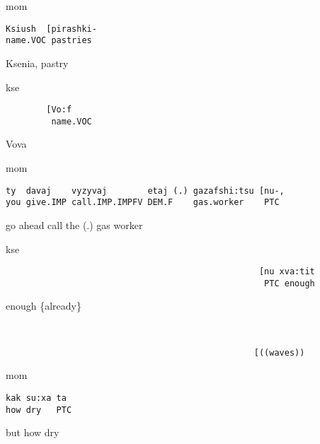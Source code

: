 \documentclass[output=paper,modfonts,nonflat]{langsci/langscibook}
\begin{document}
\vspace{2mm}
%
\begin{transbox}{1}{mom}
\begin{verbatim}
Ksiush  [pirashki-
name.VOC pastries
\end{verbatim}
Ksenia, pastry
\end{transbox}
%
\begin{transbox}{2}{kse}
\begin{verbatim}
        [Vo:f
         name.VOC
\end{verbatim}
\hspace{1.2cm} Vova
\end{transbox}
%
\begin{mdframednoverticalspace}[style=firstfoc]
\begin{transbox}{3}{mom}
\begin{verbatim}
ty  davaj    vyzyvaj        etaj (.) gazafshi:tsu [nu-,
you give.IMP call.IMP.IMPFV DEM.F    gas.worker    PTC
\end{verbatim}
go ahead call the (.) gas worker
\end{transbox}
\end{mdframednoverticalspace}
%
\begin{mdframednoverticalspace}[style=secondfoc]
\begin{transbox}{4}{kse}
\begin{verbatim}
                                                  [nu xva:tit
                                                   PTC enough
\end{verbatim}
\hspace{7.4cm} enough \{already\}
\end{transbox}
\end{mdframednoverticalspace}
%
\begin{mdframednoverticalspace}[style=secondfoc]
\begin{transbox}{5}{~}
\begin{verbatim}
                                                 [((waves))
\end{verbatim}
\end{transbox}
\end{mdframednoverticalspace}
%
\begin{transbox}{6}{mom}
\begin{verbatim}
kak su:xa ta
how dry   PTC
\end{verbatim}
but how dry
\end{transbox}\bigskip
\end{document}
